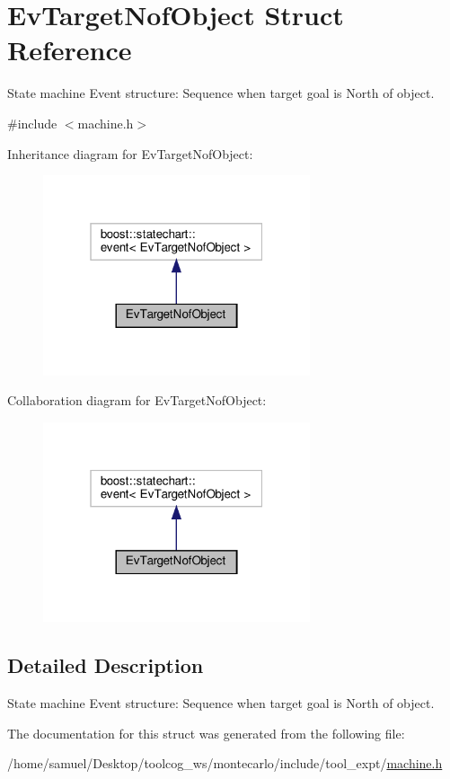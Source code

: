 \hypertarget{structEvTargetNofObject}{}\section{Ev\+Target\+Nof\+Object Struct Reference}
\label{structEvTargetNofObject}


State machine Event structure\+: Sequence when target goal is North of object.  




{\ttfamily \#include $<$machine.\+h$>$}



Inheritance diagram for Ev\+Target\+Nof\+Object\+:
\nopagebreak
\begin{figure}[H]
\begin{center}
\leavevmode
\includegraphics[width=223pt]{structEvTargetNofObject__inherit__graph}
\end{center}
\end{figure}


Collaboration diagram for Ev\+Target\+Nof\+Object\+:
\nopagebreak
\begin{figure}[H]
\begin{center}
\leavevmode
\includegraphics[width=223pt]{structEvTargetNofObject__coll__graph}
\end{center}
\end{figure}


\subsection{Detailed Description}
State machine Event structure\+: Sequence when target goal is North of object. 

The documentation for this struct was generated from the following file\+:\begin{DoxyCompactItemize}
\item 
/home/samuel/\+Desktop/toolcog\+\_\+ws/montecarlo/include/tool\+\_\+expt/\hyperlink{machine_8h}{machine.\+h}\end{DoxyCompactItemize}
